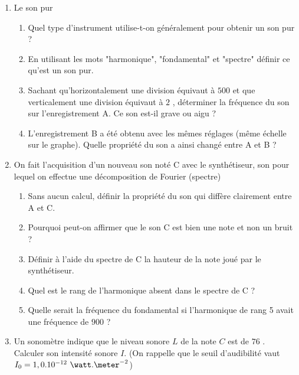 \begin{minipage}[c]{.46\linewidth}
\begin{enumerate}
\item Le son pur
\begin{enumerate}
\item Quel type d'instrument utilise-t-on généralement pour obtenir un son pur ?
\item En utilisant les mots "harmonique", "fondamental" et "spectre" définir ce
qu'est un son pur.
\item Sachant qu'horizontalement une division équivaut à $500$ \micro\second et que
verticalement une division équivaut à $2$ \milli\volt, déterminer la fréquence du son
sur l'enregistrement A. Ce son est-il grave ou aigu ?
\item L'enregistrement B a été obtenu avec les mêmes réglages (même échelle sur le graphe). Quelle propriété du son a ainsi changé entre A et B ?
\end{enumerate}
\item On fait l'acquisition d'un nouveau son noté C avec le synthétiseur, son pour
lequel on effectue une décomposition de Fourier (spectre)
\begin{enumerate}
\item Sans aucun calcul, définir la propriété du son qui diffère clairement entre A et C.
\item Pourquoi peut-on affirmer que le son C est bien une note et non un bruit ?
\item Définir à l'aide du spectre de C la hauteur de la note joué par le synthétiseur.
\item Quel est le rang de l'harmonique absent dans le spectre de C ?
\item Quelle serait la fréquence du fondamental si l'harmonique de rang 5 avait une fréquence de $900$ \hertz ?
\end{enumerate}
\item Un sonomètre indique que le niveau sonore $L$ de la note $C$ est de $76$ \deci\bel. Calculer son intensité sonore $I$. (On rappelle que le seuil d'audibilité vaut $I_{0} = 1,0 . 10^{-12}\text{ }\watt.\meter^{-2}$)
\end{enumerate}
\end{minipage}
